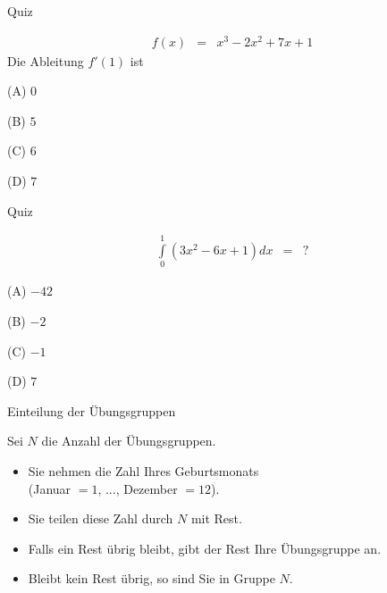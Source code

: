 \documentclass[german]{beamer}
\newcommand{\bq}{\begin{eqnarray*}}
\newcommand{\eq}{\end{eqnarray*}}
\begin{document}
\begin{frame}{Quiz}

\bq
 f\left(x\right) & = & x^3 - 2 x^2 + 7 x +1
\eq 
Die Ableitung $f'(1)$ ist 
\begin{description}
\item{(A)} $0$
\item{(B)} $5$
\item{(C)} $6$
\item{(D)} $7$
\end{description}

\end{frame}

\begin{frame}{Quiz}

\bq
 \int\limits_0^1 \left( 3 x^2 - 6 x + 1 \right) dx & = & ?
\eq 
\begin{description}
\item{(A)} $-42$
\item{(B)} $-2$
\item{(C)} $-1$
\item{(D)} $7$
\end{description}

\end{frame}

\begin{frame}{Einteilung der \"Ubungsgruppen}

Sei $N$ die Anzahl der \"Ubungsgruppen.
\begin{itemize}
\item Sie nehmen die Zahl Ihres Geburtsmonats \\
(Januar $=1$, ..., Dezember $=12$).
\item Sie teilen diese Zahl durch $N$ mit Rest.
\item Falls ein Rest \"ubrig bleibt, gibt der Rest Ihre \"Ubungsgruppe an.
\item Bleibt kein Rest \"ubrig, so sind Sie in Gruppe $N$.
\end{itemize}

\end{frame}
\end{document}
